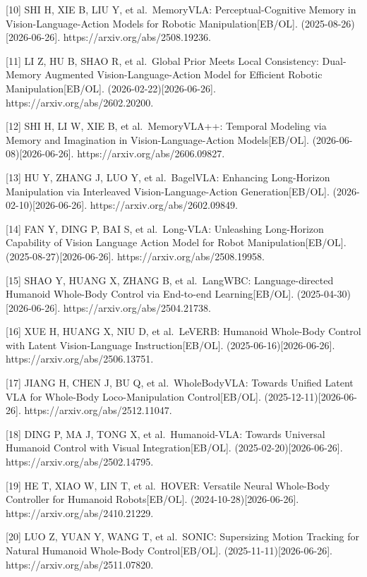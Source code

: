 \documentclass[
  chinese,
]{ctexart}
\begin{document}
{[}10{]} SHI H, XIE B, LIU Y, et al.~MemoryVLA: Perceptual-Cognitive
Memory in Vision-Language-Action Models for Robotic
Manipulation{[}EB/OL{]}. (2025-08-26){[}2026-06-26{]}.
https://arxiv.org/abs/2508.19236.

{[}11{]} LI Z, HU B, SHAO R, et al.~Global Prior Meets Local
Consistency: Dual-Memory Augmented Vision-Language-Action Model for
Efficient Robotic Manipulation{[}EB/OL{]}. (2026-02-22){[}2026-06-26{]}.
https://arxiv.org/abs/2602.20200.

{[}12{]} SHI H, LI W, XIE B, et al.~MemoryVLA++: Temporal Modeling via
Memory and Imagination in Vision-Language-Action Models{[}EB/OL{]}.
(2026-06-08){[}2026-06-26{]}. https://arxiv.org/abs/2606.09827.

{[}13{]} HU Y, ZHANG J, LUO Y, et al.~BagelVLA: Enhancing Long-Horizon
Manipulation via Interleaved Vision-Language-Action
Generation{[}EB/OL{]}. (2026-02-10){[}2026-06-26{]}.
https://arxiv.org/abs/2602.09849.

{[}14{]} FAN Y, DING P, BAI S, et al.~Long-VLA: Unleashing Long-Horizon
Capability of Vision Language Action Model for Robot
Manipulation{[}EB/OL{]}. (2025-08-27){[}2026-06-26{]}.
https://arxiv.org/abs/2508.19958.

{[}15{]} SHAO Y, HUANG X, ZHANG B, et al.~LangWBC: Language-directed
Humanoid Whole-Body Control via End-to-end Learning{[}EB/OL{]}.
(2025-04-30){[}2026-06-26{]}. https://arxiv.org/abs/2504.21738.

{[}16{]} XUE H, HUANG X, NIU D, et al.~LeVERB: Humanoid Whole-Body
Control with Latent Vision-Language Instruction{[}EB/OL{]}.
(2025-06-16){[}2026-06-26{]}. https://arxiv.org/abs/2506.13751.

{[}17{]} JIANG H, CHEN J, BU Q, et al.~WholeBodyVLA: Towards Unified
Latent VLA for Whole-Body Loco-Manipulation Control{[}EB/OL{]}.
(2025-12-11){[}2026-06-26{]}. https://arxiv.org/abs/2512.11047.

{[}18{]} DING P, MA J, TONG X, et al.~Humanoid-VLA: Towards Universal
Humanoid Control with Visual Integration{[}EB/OL{]}.
(2025-02-20){[}2026-06-26{]}. https://arxiv.org/abs/2502.14795.

{[}19{]} HE T, XIAO W, LIN T, et al.~HOVER: Versatile Neural Whole-Body
Controller for Humanoid Robots{[}EB/OL{]}. (2024-10-28){[}2026-06-26{]}.
https://arxiv.org/abs/2410.21229.

{[}20{]} LUO Z, YUAN Y, WANG T, et al.~SONIC: Supersizing Motion
Tracking for Natural Humanoid Whole-Body Control{[}EB/OL{]}.
(2025-11-11){[}2026-06-26{]}. https://arxiv.org/abs/2511.07820.
\end{document}
